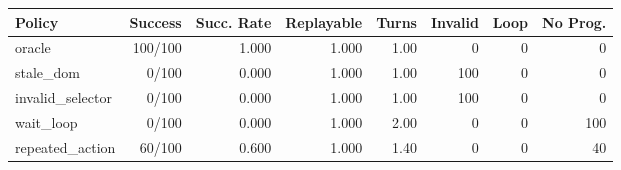 \begin{tabular}{lrrrrrrr}
\toprule
Policy & Success & Succ. Rate & Replayable & Turns & Invalid & Loop & No Prog. \\
\midrule
oracle & 100/100 & 1.000 & 1.000 & 1.00 & 0 & 0 & 0 \\
stale\_dom & 0/100 & 0.000 & 1.000 & 1.00 & 100 & 0 & 0 \\
invalid\_selector & 0/100 & 0.000 & 1.000 & 1.00 & 100 & 0 & 0 \\
wait\_loop & 0/100 & 0.000 & 1.000 & 2.00 & 0 & 0 & 100 \\
repeated\_action & 60/100 & 0.600 & 1.000 & 1.40 & 0 & 0 & 40 \\
\bottomrule
\end{tabular}

